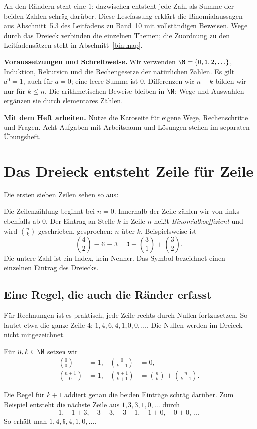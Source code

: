 An den Rändern steht eine $1$; dazwischen entsteht jede Zahl als Summe
der beiden Zahlen schräg darüber. Diese Lesefassung erklärt die
Binomialaussagen aus Abschnitt~5.3 des Leitfadens zu Band~10 mit
vollständigen Beweisen. Wege durch das Dreieck verbinden die einzelnen
Themen; die Zuordnung zu den Leitfadensätzen steht in Abschnitt~\ref{bin:map}.

\textbf{Voraussetzungen und Schreibweise.}
Wir verwenden $\N=\{0,1,2,\ldots\}$, Induktion, Rekursion und die
Rechengesetze der natürlichen Zahlen. Es gilt $a^0=1$, auch für $a=0$;
eine leere Summe ist $0$. Differenzen wie $n-k$ bilden wir nur für $k\le n$.
Die arithmetischen Beweise bleiben in $\N$; Wege und Auswahlen ergänzen
sie durch elementares Zählen.

\textbf{Mit dem Heft arbeiten.}
Nutze die Karoseite für eigene Wege, Rechenschritte und Fragen.
Acht Aufgaben mit Arbeitsraum und Lösungen stehen im separaten
\href{_B10-binomial-exercises.pdf\#binomial.exercises}{Übungsheft}.

\medskip\tableofcontents
\clearpage

\section{Das Dreieck entsteht Zeile für Zeile}
\label{bin:construction}

Die ersten sieben Zeilen sehen so aus:
\begin{center}
\end{center}
Die Zeilenzählung beginnt bei $n=0$. Innerhalb der Zeile zählen wir
von links ebenfalls ab $0$. Der Eintrag an Stelle $k$ in Zeile $n$
heißt \emph{Binomialkoeffizient} und wird $\binom nk$ geschrieben,
gesprochen: \glqq $n$ über $k$\grqq. Beispielsweise ist
\[
 \binom42=6=3+3=\binom31+\binom32.
\]
Die untere Zahl ist ein Index, kein Nenner. Das Symbol bezeichnet
einen einzelnen Eintrag des Dreiecks.

\subsection*{Eine Regel, die auch die Ränder erfasst}

Für Rechnungen ist es praktisch, jede Zeile rechts durch Nullen
fortzusetzen. So lautet etwa die ganze Zeile $4$:
$1,4,6,4,1,0,0,\ldots$. Die Nullen werden im Dreieck nicht mitgezeichnet.

\begin{definition}
Für $n,k\in\N$ setzen wir
\begin{equation}\tag{P}\label{bin:pascal}
 \begin{aligned}
 \binom00&=1,&\binom0{k+1}&=0,\\
 \binom{n+1}0&=1,&
 \binom{n+1}{k+1}&=\binom nk+\binom n{k+1}.
 \end{aligned}
\end{equation}
\end{definition}
Die Regel für $k+1$ addiert genau die beiden Einträge schräg darüber.
Zum Beispiel entsteht die nächste Zeile aus $1,3,3,1,0,\ldots$ durch
\[
 1,\quad 1+3,\quad 3+3,\quad 3+1,\quad 1+0,\quad 0+0,\ldots.
\]
So erhält man $1,4,6,4,1,0,\ldots$.

